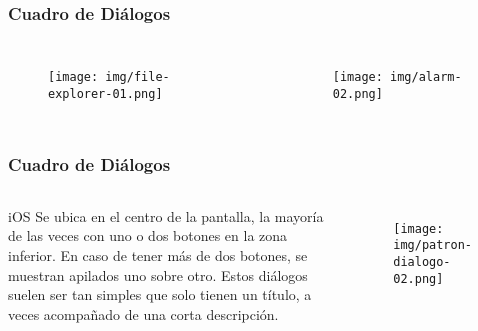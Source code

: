 \documentclass{beamer}
\begin{document}

\begin{frame}
\frametitle{Cuadro de Diálogos}

\begin{columns}[c] %

\begin{figure}[H]
  \centering
  \texttt{[image: img/file-explorer-01.png]}
\end{figure}

\begin{figure}[H]
  \centering
  \texttt{[image: img/alarm-02.png]}
\end{figure}

\end{columns}
\end{frame}


\begin{frame}
\frametitle{Cuadro de Diálogos}

\begin{columns}[c] %

\begin{block}{iOS}
\justify
Se ubica en el centro de la pantalla, la mayoría de las veces con uno o dos botones en la zona inferior. En caso de tener más de dos botones, se muestran apilados uno sobre otro. Estos diálogos suelen ser tan simples que solo tienen un título, a veces acompañado de una corta descripción.
\end{block}

\begin{figure}[H]
  \centering
  \texttt{[image: img/patron-dialogo-02.png]}
\end{figure}
\end{columns}
\end{frame}

\end{document}
